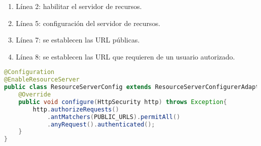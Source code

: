 \begin{enumerate}
	\begin{enumerate}
		\item Línea 2: habilitar el servidor de recursos.
		\item Línea 5: configuración del servidor de recursos.
		\item Línea 7: se establecen las URL públicas.
		\item Línea 8: se establecen las URL que requieren de un usuario autorizado.
	\end{enumerate}

\begin{lstlisting}[language=Java, caption={Clase de configuración de servidor de recursos.}, captionpos=b, label={lst:enable-resource-server}]
@Configuration
@EnableResourceServer
public class ResourceServerConfig extends ResourceServerConfigurerAdapter{
	@Override
	public void configure(HttpSecurity http) throws Exception{
		http.authorizeRequests()
			.antMatchers(PUBLIC_URLS).permitAll()
			.anyRequest().authenticated();
	}
}
\end{lstlisting}
\end{enumerate}

